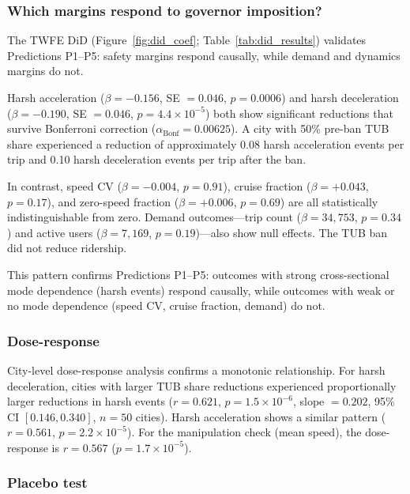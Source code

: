 \subsubsection{Which margins respond to governor imposition?}
\label{sec:res_causal}

The TWFE DiD (Figure~\ref{fig:did_coef}; Table~\ref{tab:did_results}) validates Predictions P1--P5: safety margins respond causally, while demand and dynamics margins do not.

Harsh acceleration ($\beta = -0.156$, SE $= 0.046$, $p = 0.0006$) and harsh deceleration ($\beta = -0.190$, SE $= 0.046$, $p = 4.4 \times 10^{-5}$) both show significant reductions that survive Bonferroni correction ($\alpha_{\text{Bonf}} = 0.00625$). A city with 50\% pre-ban TUB share experienced a reduction of approximately 0.08 harsh acceleration events per trip and 0.10 harsh deceleration events per trip after the ban.

In contrast, speed CV ($\beta = -0.004$, $p = 0.91$), cruise fraction ($\beta = +0.043$, $p = 0.17$), and zero-speed fraction ($\beta = +0.006$, $p = 0.69$) are all statistically indistinguishable from zero. Demand outcomes---trip count ($\beta = 34{,}753$, $p = 0.34$) and active users ($\beta = 7{,}169$, $p = 0.19$)---also show null effects. The TUB ban did not reduce ridership.

This pattern confirms Predictions P1--P5: outcomes with strong cross-sectional mode dependence (harsh events) respond causally, while outcomes with weak or no mode dependence (speed CV, cruise fraction, demand) do not.

\subsubsection{Dose-response}

City-level dose-response analysis confirms a monotonic relationship. For harsh deceleration, cities with larger TUB share reductions experienced proportionally larger reductions in harsh events ($r = 0.621$, $p = 1.5 \times 10^{-6}$, slope $= 0.202$, 95\% CI $[0.146, 0.340]$, $n = 50$ cities). Harsh acceleration shows a similar pattern ($r = 0.561$, $p = 2.2 \times 10^{-5}$). For the manipulation check (mean speed), the dose-response is $r = 0.567$ ($p = 1.7 \times 10^{-5}$).

\subsubsection{Placebo test}

